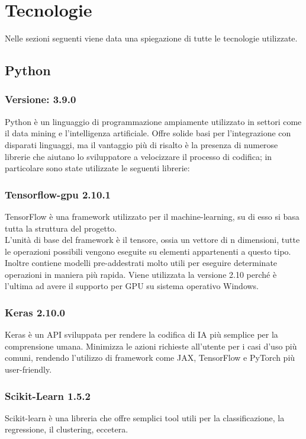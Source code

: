 \newpage

\section{Tecnologie}
\label{sec:tecnologie-strumenti}

Nelle sezioni seguenti viene data una spiegazione di tutte le tecnologie utilizzate.

\subsection{Python}

\subsubsection{Versione: 3.9.0}
Python è un linguaggio di programmazione ampiamente utilizzato in settori come il data mining e l'intelligenza artificiale. 
Offre solide basi per l'integrazione con disparati linguaggi, ma il vantaggio più di risalto è la presenza di numerose librerie che aiutano lo sviluppatore a velocizzare il processo di codifica; in particolare sono state utilizzate le seguenti librerie:

\subsubsection{Tensorflow-gpu 2.10.1}
TensorFlow è una framework utilizzato per il machine-learning, su di esso si basa tutta la struttura del progetto.\\
L'unità di base del framework è il tensore, ossia un vettore di n dimensioni, tutte le operazioni possibili vengono eseguite su elementi appartenenti a questo tipo.
Inoltre contiene modelli pre-addestrati molto utili per eseguire determinate operazioni in maniera più rapida. 
Viene utilizzata la versione 2.10 perché è l'ultima ad avere il supporto per GPU su sistema operativo Windows.

\subsubsection{Keras 2.10.0}
Keras è un API sviluppata per rendere la codifica di IA più semplice per la comprensione umana. 
Minimizza le azioni richieste all'utente per i casi d'uso più comuni, rendendo l'utilizzo di framework come JAX, TensorFlow e PyTorch più user-friendly.

\subsubsection{Scikit-Learn 1.5.2}
Scikit-learn è una libreria che offre semplici tool utili per la classificazione, la regressione, il clustering, eccetera.

